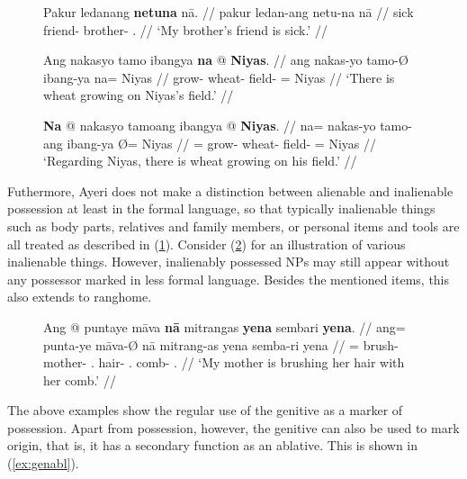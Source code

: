 \begin{figure}[h]
\pex\label{ex:genmarking}
\a\begingl
	\gla Pakur ledanang \textbf{netuna} nā. //
	\glb pakur ledan-ang netu-na nā //
	\glc sick friend-\Aarg{} brother-\Gen{} \Fsg{}.\Gen{} //
	\glft `My brother's friend is sick.' //
\endgl


\a\begingl
	\gla Ang nakasyo tamo ibangya \textbf{na} @ \textbf{Niyas}. //
	\glb ang nakas-yo tamo-Ø ibang-ya na= Niyas //
	\glc \AgtT{} grow-\TsgN{} wheat-\Top{} field-\Loc{} \Gen{}= Niyas //
	\glft `There is wheat growing on Niyas's field.' //
\endgl

\a\begingl
	\gla \textbf{Na} @ nakasyo tamoang ibangya {} @ \textbf{Niyas}. //
	\glb na= nakas-yo tamo-ang ibang-ya Ø= Niyas //
	\glc \GenT{}= grow-\TsgN{} wheat-\Aarg{} field-\Loc{} \Top{}= Niyas //
	\glft `Regarding Niyas, there is wheat growing on his field.' //
\endgl
\xe
\end{figure}

Futhermore, Ayeri does not make a distinction between alienable and inalienable
possession at least in the formal language, so that typically inalienable
things such as body parts, relatives and family members, or personal items and
tools are all treated as described in (\ref{ex:genmarking}). Consider
(\ref{ex:inalposs}) for an illustration of various inalienable things. However,
inalienably possessed NPs may still appear without any possessor marked in less
formal language. Besides the mentioned items, this also extends to 
{rang}{home}.

\begin{figure}
\ex\label{ex:inalposs}
\begingl
	\gla Ang @ puntaye māva \textbf{nā} mitrangas \textbf{yena} sembari 
		\textbf{yena}. //
	\glb ang= punta-ye māva-Ø nā mitrang-as yena semba-ri 
		yena //
	\glc \AgtT{}= brush-\TsgF{} mother-\Top{} \Fsg{}.\Gen{} hair-\Parg{} 
		\TsgF{}.\Gen{} comb-\Ins{} \TsgF{}.\Gen{} //
	\glft `My mother is brushing her hair with her comb.' //
\endgl\xe
\end{figure}

The above examples show the regular use of the genitive as a marker of
possession. Apart from possession, however, the genitive can also be used to
mark origin, that is, it has a secondary function as an ablative. This is shown
in (\ref{ex:genabl}).

